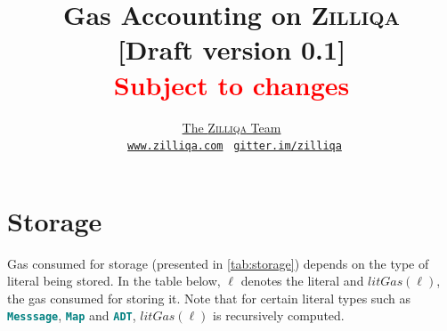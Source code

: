 \documentclass[10pt]{article}
\begin{document}
\title{\Huge{\textbf{Gas Accounting on \textsc{Zilliqa}}} \\ \small{[Draft version
0.1]} \\ \small{\textcolor{red}{Subject to changes}}}

\author{
 	\href{https://www.zilliqa.com/team.html}{The \textsc{Zilliqa} Team} \\
    \Mundus~\href{https://www.zilliqa.com}{\texttt{www.zilliqa.com}}
    \phantom{xx}\faQuestionCircle~\href{https://gitter.im/Zilliqa/SmartContract}{\texttt{gitter.im/zilliqa}}
}


\maketitle

\section{Storage}

Gas consumed for storage (presented in \autoref{tab:storage}) depends on the
type of literal being stored. In the table below, $\ell$ denotes the literal
and $litGas(\ell)$, the gas consumed for storing it. Note that for certain
literal types such as \textbf{\texttt{\textcolor{teal}{Messsage}}},
\textbf{\texttt{\textcolor{teal}{Map}}} and
\textbf{\texttt{\textcolor{teal}{ADT}}}, $litGas(\ell)$ is recursively
computed. 
\end{document}
